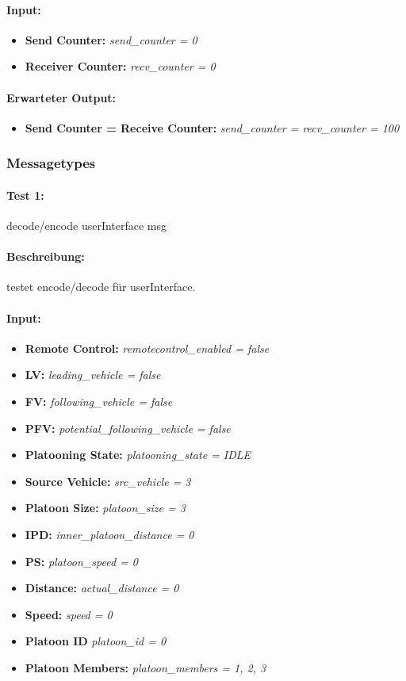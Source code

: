 \documentclass[a4paper, 12pt, titlepage]{scrartcl}
\begin{document}
{			\paragraph{Input:}
			\begin{itemize} \itemsep-0.5em
				\item \textbf{Send Counter:} \emph{send\_counter = 0}
				\item \textbf{Receiver Counter:} \emph{recv\_counter = 0}
			\end{itemize}
			\paragraph{Erwarteter Output:}
			\begin{itemize} \itemsep-0.5em
				\item \textbf{Send Counter = Receive Counter:} \emph{send\_counter = recv\_counter 	= 100}
			\end{itemize}
		
		
			\subsubsection{Messagetypes}
			\label{message_types}
			\paragraph{Test 1:}{decode/encode userInterface msg}
			\paragraph{Beschreibung:} testet encode/decode für userInterface.
			\paragraph{Input:}
			\begin{itemize} \itemsep-0.5em
				\item \textbf{Remote Control:} \emph{remotecontrol\_enabled = false}
				\item \textbf{LV:} \emph{leading\_vehicle = false}
				\item \textbf{FV:} \emph{following\_vehicle = false}
				\item \textbf{PFV:} \emph{potential\_following\_vehicle = false}
				\item \textbf{Platooning State:} \emph{platooning\_state = IDLE}
				\item \textbf{Source Vehicle:} \emph{src\_vehicle = 3}
				\item \textbf{Platoon Size:} \emph{platoon\_size = 3}
				\item \textbf{IPD:} \emph{inner\_platoon\_distance = 0}
				\item \textbf{PS:} \emph{platoon\_speed = 0}
				\item \textbf{Distance:} \emph{actual\_distance = 0}
				\item \textbf{Speed:} \emph{speed = 0}
				\item \textbf{Platoon ID} \emph{platoon\_id = 0}
				\item \textbf{Platoon Members:} \emph{platoon\_members = {1, 2, 3}}
			\end{itemize}
}
\end{document}
